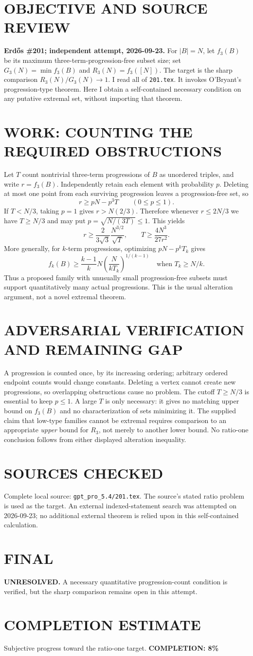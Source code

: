 \section{OBJECTIVE AND SOURCE REVIEW}
\textbf{Erd\H{o}s \#201; independent attempt, 2026-09-23.}
For $|B|=N$, let $f_3(B)$ be its maximum three-term-progression-free subset size; set $G_3(N)=\min f_3(B)$ and $R_3(N)=f_3([N])$. The target is the sharp comparison $R_3(N)/G_3(N)\to1$. I read all of \texttt{201.tex}. It invokes O'Bryant's progression-type theorem. Here I obtain a self-contained necessary condition on any putative extremal set, without importing that theorem.
\section{WORK: COUNTING THE REQUIRED OBSTRUCTIONS}
Let $T$ count nontrivial three-term progressions of $B$ as unordered triples, and write $r=f_3(B)$. Independently retain each element with probability $p$. Deleting at most one point from each surviving progression leaves a progression-free set, so
\[
r\ge pN-p^3T\qquad(0\le p\le1).
\]
If $T<N/3$, taking $p=1$ gives $r>N(2/3)$. Therefore whenever $r\le2N/3$ we have $T\ge N/3$ and may put $p=\sqrt{N/(3T)}\le1$. This yields
\[
r\ge\frac{2}{3\sqrt3}\frac{N^{3/2}}{\sqrt T},
\qquad
T\ge\frac{4N^3}{27r^2}.
\]
More generally, for $k$-term progressions, optimizing $pN-p^kT_k$ gives
\[
f_k(B)\ge\frac{k-1}{k}N\left(\frac{N}{kT_k}\right)^{1/(k-1)}
\quad\text{when }T_k\ge N/k.
\]
Thus a proposed family with unusually small progression-free subsets must support quantitatively many actual progressions. This is the usual alteration argument, not a novel extremal theorem.
\section{ADVERSARIAL VERIFICATION AND REMAINING GAP}
A progression is counted once, by its increasing ordering; arbitrary ordered endpoint counts would change constants. Deleting a vertex cannot create new progressions, so overlapping obstructions cause no problem. The cutoff $T\ge N/3$ is essential to keep $p\le1$. A large $T$ is only necessary: it gives no matching upper bound on $f_3(B)$ and no characterization of sets minimizing it. The supplied claim that low-type families cannot be extremal requires comparison to an appropriate \emph{upper} bound for $R_3$, not merely to another lower bound. No ratio-one conclusion follows from either displayed alteration inequality.
\section{SOURCES CHECKED}
Complete local source: \texttt{gpt\_pro\_5.4/201.tex}. The source's stated ratio problem is used as the target. An external indexed-statement search was attempted on 2026-09-23; no additional external theorem is relied upon in this self-contained calculation.
\section{FINAL}
\textbf{UNRESOLVED.} A necessary quantitative progression-count condition is verified, but the sharp comparison remains open in this attempt.
\section{COMPLETION ESTIMATE}
Subjective progress toward the ratio-one target.
\textbf{COMPLETION: 8\%}
